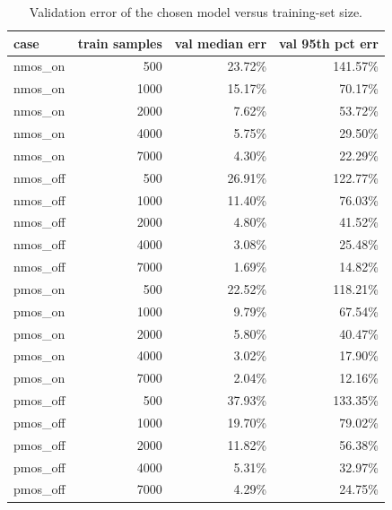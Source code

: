 \begin{table}[H]
\centering
{\small
\begin{tabular}{lrrr}
\toprule
case & train samples & val median err & val 95th pct err \\
\midrule
nmos\_on & 500 & 23.72\% & 141.57\% \\
nmos\_on & 1000 & 15.17\% & 70.17\% \\
nmos\_on & 2000 & 7.62\% & 53.72\% \\
nmos\_on & 4000 & 5.75\% & 29.50\% \\
nmos\_on & 7000 & 4.30\% & 22.29\% \\
nmos\_off & 500 & 26.91\% & 122.77\% \\
nmos\_off & 1000 & 11.40\% & 76.03\% \\
nmos\_off & 2000 & 4.80\% & 41.52\% \\
nmos\_off & 4000 & 3.08\% & 25.48\% \\
nmos\_off & 7000 & 1.69\% & 14.82\% \\
pmos\_on & 500 & 22.52\% & 118.21\% \\
pmos\_on & 1000 & 9.79\% & 67.54\% \\
pmos\_on & 2000 & 5.80\% & 40.47\% \\
pmos\_on & 4000 & 3.02\% & 17.90\% \\
pmos\_on & 7000 & 2.04\% & 12.16\% \\
pmos\_off & 500 & 37.93\% & 133.35\% \\
pmos\_off & 1000 & 19.70\% & 79.02\% \\
pmos\_off & 2000 & 11.82\% & 56.38\% \\
pmos\_off & 4000 & 5.31\% & 32.97\% \\
pmos\_off & 7000 & 4.29\% & 24.75\% \\
\bottomrule
\end{tabular}
}
\caption{Validation error of the chosen model versus training-set size.}
\label{tab:lc}
\end{table}

